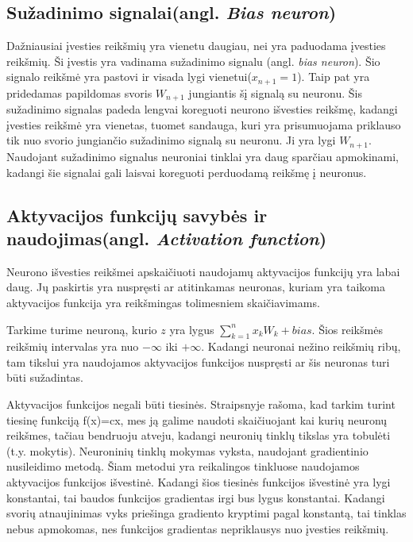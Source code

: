 \subsection{Sužadinimo signalai(angl. \textit{Bias neuron})}
Dažniausiai įvesties reikšmių yra vienetu daugiau, nei yra paduodama įvesties reikšmių. Ši įvestis yra vadinama sužadinimo signalu (angl. \textit{bias neuron}). Šio signalo reikšmė yra pastovi ir visada lygi vienetui($x_{n+1} = 1$). Taip pat yra pridedamas papildomas svoris $W_{n+1}$ jungiantis šį signalą su neuronu.\cite{Ieva2012}
Šis sužadinimo signalas padeda lengvai koreguoti neurono išvesties reikšmę, kadangi įvesties reikšmė yra vienetas, tuomet sandauga, kuri yra prisumuojama priklauso tik nuo svorio jungiančio sužadinimo signalą su neuronu. Ji yra lygi  $W_{n+1}$. Naudojant sužadinimo signalus neuroniai tinklai yra daug sparčiau apmokinami, kadangi šie signalai gali laisvai koreguoti perduodamą reikšmę į neuronus.
  \subsection{Aktyvacijos funkcijų savybės ir naudojimas(angl. \textit{Activation function})}
Neurono išvesties reikšmei apskaičiuoti naudojamų aktyvacijos funkcijų yra labai daug. Jų paskirtis yra nuspręsti ar atitinkamas neuronas, kuriam yra taikoma aktyvacijos funkcija yra reikšmingas tolimesniem skaičiavimams.

Tarkime turime neuroną, kurio $z$ yra lygus $\sum_{k=1}^{n} x_k W_k + bias$. Šios reikšmės reikšmių intervalas yra nuo $-\infty$ iki $+\infty$. Kadangi neuronai nežino reikšmių ribų, tam tikslui yra naudojamos aktyvacijos funkcijos nuspręsti ar šis neuronas turi būti sužadintas.

Aktyvacijos funkcijos negali būti tiesinės. Straipsnyje rašoma, kad tarkim turint tiesinę funkciją f(x)=cx, mes ją galime naudoti skaičiuojant kai kurių neuronų reikšmes, tačiau bendruoju atveju, kadangi neuronių tinklų tikslas yra tobulėti (t.y. mokytis). Neuroninių tinklų mokymas vyksta, naudojant gradientinio nusileidimo metodą. Šiam metodui yra reikalingos tinkluose naudojamos aktyvacijos funkcijos išvestinė. Kadangi šios tiesinės funkcijos išvestinė yra lygi konstantai, tai baudos funkcijos gradientas irgi bus lygus konstantai. Kadangi svorių atnaujinimas vyks priešinga gradiento kryptimi pagal konstantą, tai tinklas nebus apmokomas, nes funkcijos gradientas nepriklausys nuo įvesties reikšmių. \cite{Avinash2017}

